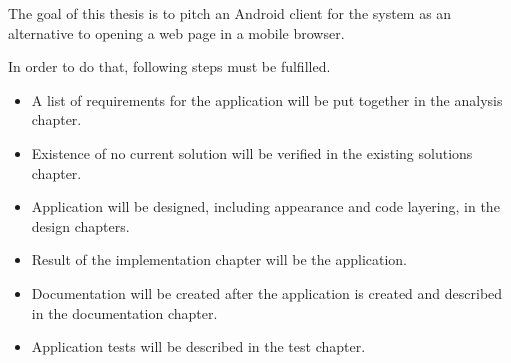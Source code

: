 The goal of this thesis is to pitch an Android client for the \etl{} system as an alternative to opening a web page in a mobile browser.

In order to do that, following steps must be fulfilled.

\begin{itemize}
    \item A list of requirements for the application will be put together in the analysis chapter.
    \item Existence of no current solution will be verified in the existing solutions chapter.
    \item Application will be designed, including appearance and code layering, in the design chapters.
    \item Result of the implementation chapter will be the application.
    \item Documentation will be created after the application is created and described in the documentation chapter.
    \item Application tests will be described in the test chapter.
\end{itemize}